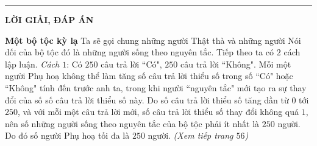 \vspace*{-10pt}
{\color{duongvaotoanhoc}\rule{1\linewidth}{1pt}}
\vskip 0.2cm
\centerline{\Large{\textbf{\color{duongvaotoanhoc}LỜI GIẢI, ĐÁP ÁN}}}
\vskip 0.1cm
\begin{multicols}{2}
	\textbf{\color{duongvaotoanhoc}Một bộ tộc kỳ lạ}
	\vskip 0.1cm
	Ta sẽ gọi chung những người Thật thà và những người Nói dối của bộ tộc đó là những người sống theo nguyên tắc. Tiếp theo ta có $2$ cách lập luận.
	\vskip 0.1cm
	\textit{Cách $1$}: 
	Có $250$ câu trả lời ``Có", $250$ câu trả lời ``Không". Mỗi một người Phụ hoạ không thể làm tăng số câu trả lời thiểu số trong số ``Có" hoặc ``Không" tính đến trước anh ta, trong khi người ``nguyên tắc" mới tạo ra sự thay đổi của số số câu trả lời thiểu số này. Do số câu trả lời thiểu số tăng dần từ $0$ tới $250$, và với mỗi một câu trả lời mới, số câu trả lời thiểu số thay đổi không quá $1$, nên số những người sống theo nguyên tắc của bộ tộc phải ít nhất là $250$ người. Do đó số người Phụ hoạ tối đa là $250$ người.
	\vskip 0.1cm
	\hfill \textit{(Xem tiếp trang $56$)}
\end{multicols}